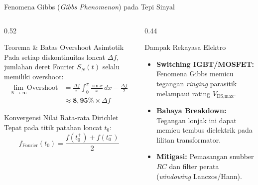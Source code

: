 \documentclass[aspectratio=169,10pt]{beamer}
\begin{document}
\begin{frame}{Fenomena Gibbs (\textit{Gibbs Phenomenon}) pada Tepi Sinyal}
  \begin{columns}[t]
    \begin{column}{0.52\textwidth}
      \begin{alertblock}{Teorema \& Batas Overshoot Asimtotik}
        \small
        Pada setiap diskontinuitas loncat $\Delta f$, jumlahan deret Fourier $S_N(t)$ selalu memiliki overshoot:
        \begin{align*}
          \lim_{N \to \infty} \text{Overshoot} &= \frac{\Delta f}{\pi} \int_{0}^{\pi} \frac{\sin x}{x} \, dx - \frac{\Delta f}{2} \\
          &\approx \mathbf{8{,}95\%} \times \Delta f
        \end{align*}
      \end{alertblock}
      \begin{block}{Konvergensi Nilai Rata-rata Dirichlet}
        \small
        Tepat pada titik patahan loncat $t_0$:
        \begin{equation*}
          f_{\text{Fourier}}(t_0) = \frac{f(t_0^+) + f(t_0^-)}{2}
        \end{equation*}
      \end{block}
    \end{column}
    \begin{column}{0.44\textwidth}
      \begin{exampleblock}{Dampak Rekayasa Elektro}
        \small
        \begin{itemize}
          \item \textbf{Switching IGBT/MOSFET:} Fenomena Gibbs memicu tegangan \textit{ringing} parasitik melampaui rating $V_{\text{DS,max}}$.
          \item \textbf{Bahaya Breakdown:} Tegangan lonjak ini dapat memicu tembus dielektrik pada lilitan transformator.
          \item \textbf{Mitigasi:} Pemasangan snubber $RC$ dan filter perata (\textit{windowing} Lanczos/Hann).
        \end{itemize}
      \end{exampleblock}
    \end{column}
  \end{columns}
\end{frame}
\end{document}
